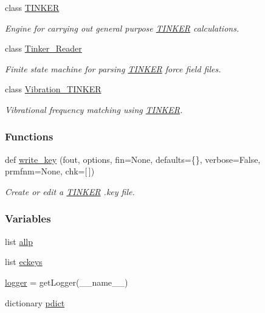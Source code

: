 \begin{DoxyCompactItemize}
class \hyperlink{classsrc_1_1tinkerio_1_1TINKER}{T\+I\+N\+K\+ER}
\begin{DoxyCompactList}\small\item\em Engine for carrying out general purpose \hyperlink{classsrc_1_1tinkerio_1_1TINKER}{T\+I\+N\+K\+ER} calculations. \end{DoxyCompactList}\item 
class \hyperlink{classsrc_1_1tinkerio_1_1Tinker__Reader}{Tinker\+\_\+\+Reader}
\begin{DoxyCompactList}\small\item\em Finite state machine for parsing \hyperlink{classsrc_1_1tinkerio_1_1TINKER}{T\+I\+N\+K\+ER} force field files. \end{DoxyCompactList}\item 
class \hyperlink{classsrc_1_1tinkerio_1_1Vibration__TINKER}{Vibration\+\_\+\+T\+I\+N\+K\+ER}
\begin{DoxyCompactList}\small\item\em Vibrational frequency matching using \hyperlink{classsrc_1_1tinkerio_1_1TINKER}{T\+I\+N\+K\+ER}. \end{DoxyCompactList}\end{DoxyCompactItemize}
\subsubsection*{Functions}
\begin{DoxyCompactItemize}
\item 
def \hyperlink{namespacesrc_1_1tinkerio_a31804fdc4114aacf17a92c48595cbab0}{write\+\_\+key} (fout, options, fin=None, defaults=\{\}, verbose=False, prmfnm=None, chk=\mbox{[}$\,$\mbox{]})
\begin{DoxyCompactList}\small\item\em Create or edit a \hyperlink{classsrc_1_1tinkerio_1_1TINKER}{T\+I\+N\+K\+ER} .key file. \end{DoxyCompactList}\end{DoxyCompactItemize}
\subsubsection*{Variables}
\begin{DoxyCompactItemize}
\item 
list \hyperlink{namespacesrc_1_1tinkerio_a6ba025f75f7361d1ac7d242797561ff7}{allp}
\item 
list \hyperlink{namespacesrc_1_1tinkerio_a0a06196607dcb099012894f7997ea81a}{eckeys}
\item 
\hyperlink{namespacesrc_1_1tinkerio_ae4bc471e9f9ecfced2b990ffa2b781aa}{logger} = get\+Logger(\+\_\+\+\_\+name\+\_\+\+\_\+)
\item 
dictionary \hyperlink{namespacesrc_1_1tinkerio_aba760bdf570ad66c513d1ab4b2888cc1}{pdict}
\end{DoxyCompactItemize}


